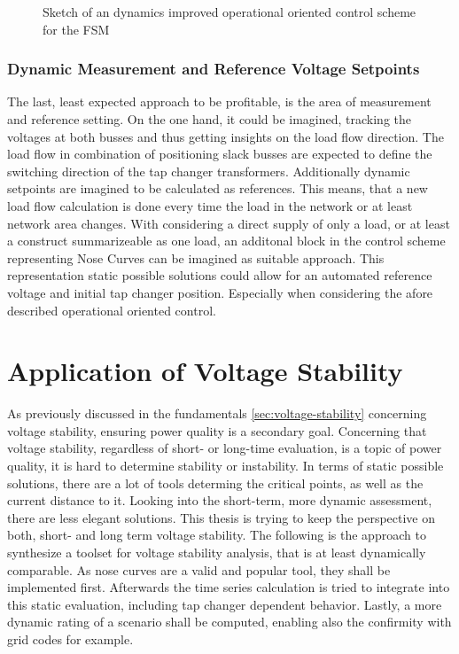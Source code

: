\begin{figure}
        \centering
        \caption[Sketch of an dynamics improved operational oriented control scheme for the \acs{FSM}]{Sketch of an dynamics improved operational oriented control scheme for the \acs{FSM}}
        \label{fig:sketch-control-improvement}
\end{figure}

\subsubsection{Dynamic Measurement and Reference Voltage Setpoints}

The last, least expected approach to be profitable, is the area of measurement and reference setting.
On the one hand, it could be imagined, tracking the voltages at both busses and thus getting insights on the load flow direction.
The load flow in combination of positioning slack busses are expected to define the switching direction of the tap changer transformers.
Additionally dynamic setpoints are imagined to be calculated as references.
This means, that a new load flow calculation is done every time the load in the network or at least network area changes.
With considering a direct supply of only a load, or at least a construct summarizeable as one load, an additonal block in the control scheme representing Nose Curves can be imagined as suitable approach.
This representation static possible solutions could allow for an automated reference voltage and initial tap changer position.
Especially when considering the afore described operational oriented control.

\section{Application of Voltage Stability}
\label{sec:application-voltage-stability}

As previously discussed in the fundamentals \autoref{sec:voltage-stability} concerning voltage stability, ensuring power quality is a secondary goal.
Concerning that voltage stability, regardless of short- or long-time evaluation, is a topic of power quality, it is hard to determine stability or instability.
In terms of static possible solutions, there are a lot of tools determing the critical points, as well as the current distance to it.
Looking into the short-term, more dynamic assessment, there are less elegant solutions. 
This thesis is trying to keep the perspective on both, short- and long term voltage stability.
The following is the approach to synthesize a toolset for voltage stability analysis, that is at least dynamically comparable.
As nose curves are a valid and popular tool, they shall be implemented first. 
Afterwards the time series calculation is tried to integrate into this static evaluation, including tap changer dependent behavior.
Lastly, a more dynamic rating of a scenario shall be computed, enabling also the confirmity with grid codes for example.

